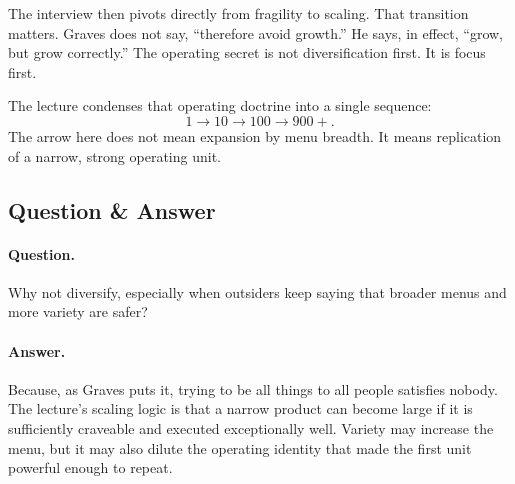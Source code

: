 The interview then pivots directly from fragility to scaling. That transition matters. Graves does not say, ``therefore avoid growth.'' He says, in effect, ``grow, but grow correctly.'' The operating secret is not diversification first. It is focus first.

The lecture condenses that operating doctrine into a single sequence:
\begin{equation}
1 \longrightarrow 10 \longrightarrow 100 \longrightarrow 900+.
\end{equation}
The arrow here does not mean expansion by menu breadth. It means replication of a narrow, strong operating unit.

\begin{figure}[h]
\centering
{}
\end{figure}

\subsection{Question \& Answer}

\paragraph{Question.}
Why not diversify, especially when outsiders keep saying that broader menus and more variety are safer?

\paragraph{Answer.}
Because, as Graves puts it, trying to be all things to all people satisfies nobody. The lecture's scaling logic is that a narrow product can become large if it is sufficiently craveable and executed exceptionally well. Variety may increase the menu, but it may also dilute the operating identity that made the first unit powerful enough to repeat.

